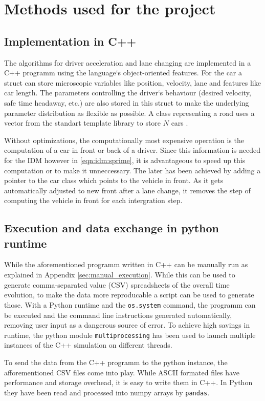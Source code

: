 \section{Methods used for the project}
\label{sec:methods}

\subsection{Implementation in C++}
\label{sec:implementation}
The algorithms for driver acceleration and lane changing are implemented in a C++ programm using the language`s
object-oriented features. For the car a struct can store microscopic variables like position, velocity, lane and
features like car length. The parameters controlling the driver`s behaviour (desired velocity, safe time headaway, etc.)
are also stored in this struct to make the underlying parameter distribution as flexible as possible. A class
representing a road uses a vector from the standart template library to store $N$ cars \cite{cpp-vector}.

Without optimizations, the computationally most expensive operation is the computation of a car in front or back of a
driver. Since this information is needed for the IDM however in \ref{eqn:idm:sprime}, it is advantageous to speed up
this computation or to make it unneccessary. The later has been achieved by adding a pointer to the car class which
points to the vehicle in front. As it gets automatically adjusted to new front after a lane change, it removes the step
of computing the vehicle in front for each intergration step.

\subsection{Execution and data exchange in python runtime}
While the aforementioned programm written in C++ can be manually run as explained in Appendix
\ref{sec:manual_execution}. While this can be used to generate comma-separated value (CSV) spreadsheets of the overall time
evolution, to make the data more reproducable a script can be used to generate those. With a Python runtime and the
\texttt{os.system}
command, the programm can be executed and the command line instructions generated automatically, removing user input as
a dangerous source of error. To achieve high savings in runtime, the python module \texttt{multiprocessing} has been
used to launch multiple instances of the C++ simulation on different threads. 

To send the data from the C++ programm to the python instance, the afforementioned CSV files come into play. While ASCII
formated files have performance and storage overhead, it is easy to write them in C++. In Python they have been read and
processed into numpy arrays by \texttt{pandas}.

